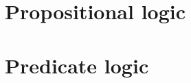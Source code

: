 \documentclass[11pt,a4paper]{report}
\begin{document}



\part{Propositional logic}






\part{Predicate logic}



% 


% 
% 



\end{document}
